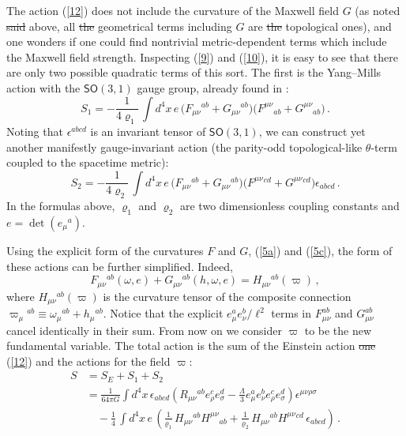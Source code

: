 \documentclass[11pt, a4paper]{article}
\newcommand{\lang}[1]{\textcolor{langfix}{#1}}
\newcommand{\subst}[1]{\textcolor{substantive}{#1}}
\newcommand{\rem}[1]{\textcolor{removeprop}{\sout{#1}}}
\def\SO{\mathsf{SO}}
\begin{document}
The action (\ref{12}) does not include \lang{the} curvature of the Maxwell field $G$ (as \lang{noted} \rem{said} above, all \rem{the} geometrical terms including $G$ are \rem{the} topological ones), and one wonders if one could find nontrivial \lang{metric-dependent} terms which include the Maxwell field strength. Inspecting (\ref{9}) and (\ref{10}), it is easy to see that there are only two possible \lang{quadratic} terms of this sort. The first is the Yang--Mills action with the $\SO(3,1)$ gauge group, already found in \cite{Soroka:2011tc, Durka:2011nf}:
\begin{equation}\label{13}
S_{1}= - \frac{1}{4\varrho_1}\,\int d^4x\, e\, \big( F_{\mu\nu}{}^{ab} + G_{\mu\nu}{}^{ab}\big) \big( F^{\mu\nu}{}_{ab} + G^{\mu\nu}{}_{ab}\big)\, .
\end{equation}
Noting that $\epsilon^{abcd}$ is an invariant tensor of $\SO(3,1)$, we can construct yet another manifestly gauge-invariant action \subst{(the parity-odd topological-like $\theta$-term coupled to the spacetime metric)}:
\begin{equation}\label{13a}
S_{2}= - \frac{1}{4\varrho_2}\,\int d^4x\, e\, \big( F_{\mu\nu}{}^{ab} + G_{\mu\nu}{}^{ab}\big) \big( F^{\mu\nu}{}^{cd} + G^{\mu\nu}{}^{cd}\big) \epsilon_{abcd}\, .
\end{equation}
In the formulas above, $\varrho_1$ and $\varrho_2$ are two dimensionless coupling constants \subst{and $e = \det(e_\mu{}^a)$}.

Using the explicit form of the curvatures $F$ and $G$, (\ref{5a}) and (\ref{5c}), the form of these actions can be further simplified. Indeed,
\begin{equation}
F_{\mu\nu}{}^{ab}(\omega, e) + G_{\mu\nu}{}^{ab}(h,\omega,e) = H_{\mu\nu}{}^{ab}(\varpi)\,,
\end{equation}
where $H_{\mu\nu}{}^{ab}(\varpi)$ is the curvature tensor of the composite connection $\varpi_{\mu}{}^{ab}\equiv \omega_{\mu}{}^{ab}+h_{\mu}{}^{ab}$. \subst{Notice that the explicit $e_\mu^a e_\nu^b / \ell^2$ terms in $F_{\mu\nu}^{ab}$ and $G_{\mu\nu}^{ab}$ cancel identically in their sum.} From now on we consider $\varpi$ to be the new fundamental variable. The total action is the sum of the Einstein \lang{action} \rem{one} (\ref{12}) and the actions for the field $\varpi$:
\begin{align}
S &= S_E + S_1 +S_2 \nonumber\\
&=\frac{1}{64\pi G}\int d^4x\,\epsilon_{abcd}\left(R_{\mu\nu}{}^{ab}e_{\rho}^{c}e_{\sigma}^{d}
-\frac{\Lambda}{3}e_{\mu}^{a}e_{\nu}^{b}e_{\rho}^{ c}e_{\sigma}^{
d}\right)\epsilon^{\mu\nu\rho\sigma}\nonumber\\
&\quad -\frac{1}{4}\,\int d^4x\, e\, \left(\frac{1}{\varrho_1}\, H_{\mu\nu}{}^{ab}
H^{\mu\nu}{}_{ab}+ \frac{1}{\varrho_2}\,H_{\mu\nu}{}^{ab}
H^{\mu\nu}{}^{cd}\,\epsilon_{abcd}\right)\, .\label{14}
\end{align}
\end{document}

